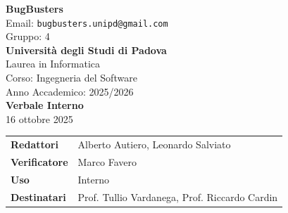 \documentclass[a4paper,12pt]{article}
\begin{document}
\begin{center}  
  
  {\Large\bfseries\color{primaryblue} BugBusters}\\[0.3cm]
  {\small\color{darkgray} Email: \texttt{bugbusters.unipd@gmail.com}} \\[0.1cm]
  {\small\color{darkgray} Gruppo: 4} \\[0.5cm]

  {\large\bfseries Università degli Studi di Padova}\\[0.3cm]
  {\small Laurea in Informatica}\\[0.2cm]
  {\small Corso: Ingegneria del Software}\\[0.2cm]
  {\small Anno Accademico: 2025/2026}\\[0.8cm]

  {\Huge\bfseries\color{primaryblue} Verbale Interno}\\[0.3cm]
  {\Large\color{secondaryblue} 16 ottobre 2025}\\[0.8cm]
\end{center}

\begin{center}
\begin{tcolorbox}[colback=lightgray,colframe=primaryblue,width=0.85\textwidth,arc=3mm,boxrule=0.5pt]
\begin{tabular}{@{}ll@{}}
\textbf{Redattori}    & Alberto Autiero, Leonardo Salviato \\
\textbf{Verificatore}    & Marco Favero \\
\textbf{Uso}          & Interno \\
\textbf{Destinatari}  & Prof. Tullio Vardanega, Prof. Riccardo Cardin \\
\end{tabular}
\end{tcolorbox}
\end{center}
\end{document}
